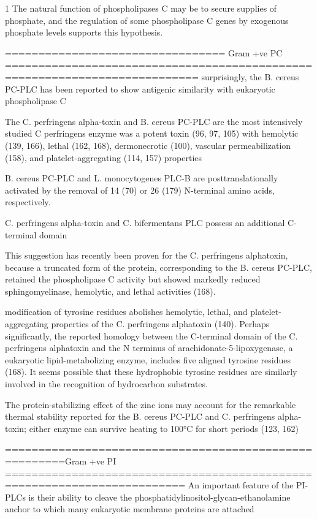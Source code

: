 1
The natural function of phospholipases C may be to secure supplies of phosphate, and the regulation of some phospholipase C genes by exogenous phosphate levels supports this hypothesis.

  ================================= Gram +ve PC ===========================================================================
surprisingly, the B. cereus PC-PLC has been reported to show antigenic similarity with eukaryotic phospholipase C 

The C. perfringens alpha-toxin and B. cereus PC-PLC are the most intensively studied
C perfringens enzyme was a potent toxin (96, 97, 105) with hemolytic (139, 166), lethal (162, 168), dermonecrotic (100), vascular permeabilization (158), and platelet-aggregating (114, 157) properties

B. cereus PC-PLC and L. monocytogenes PLC-B are posttranslationally activated by the removal of 14 (70) or 26 (179) N-terminal amino acids, respectively.


 C. perfringens alpha-toxin and C. bifermentans PLC possess an additional C-terminal domain 

  This suggestion has recently been proven for the C. perfringens alphatoxin, because a truncated form of the protein, corresponding to the B. cereus PC-PLC, retained the phospholipase C activity but showed markedly reduced sphingomyelinase, hemolytic, and lethal activities (168).

modification of tyrosine residues abolishes hemolytic, lethal, and platelet-aggregating properties of the C. perfringens alphatoxin (140). Perhaps significantly, the reported homology between the C-terminal domain of the C. perfringens alphatoxin and the N terminus of arachidonate-5-lipoxygenase, a eukaryotic lipid-metabolizing enzyme, includes five aligned tyrosine residues (168). It seems possible that these hydrophobic tyrosine residues are similarly involved in the recognition of hydrocarbon substrates.

The protein-stabilizing effect of the zinc ions may account for the remarkable thermal stability reported for the B. cereus PC-PLC and C. perfringens alpha-toxin; either enzyme can survive heating to 100°C for short periods (123, 162)

=======================================================Gram +ve PI =========================================================================
 An important feature of the PI-PLCs is their ability to cleave the phosphatidylinositol-glycan-ethanolamine anchor to which many eukaryotic membrane proteins are attached

